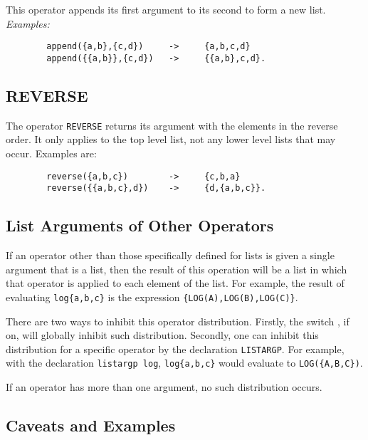 This operator appends its first argument to its second to
form a new list.
\textit{Examples:}
\begin{verbatim}
        append({a,b},{c,d})     ->     {a,b,c,d}
        append({{a,b}},{c,d})   ->     {{a,b},c,d}.
\end{verbatim}

\subsection{REVERSE}
\hypertarget{operator:REVERSE}{}

The operator \texttt{REVERSE} returns its argument with the
elements in the reverse order.  It only applies to the top level list, not
any lower level lists that may occur.  Examples are:
\begin{verbatim}
        reverse({a,b,c})        ->     {c,b,a}
        reverse({{a,b,c},d})    ->     {d,{a,b,c}}.
\end{verbatim}

\subsection{List Arguments of Other Operators}
\hypertarget{switch:LISTARGS}{}
\hypertarget{command:LISTARGP}{}

If an operator other than those specifically defined for lists is given a
single argument that is a list, then the result of this operation will be
a list in which that operator is applied to each element of the list.  For
example, the result of evaluating \texttt{log\{a,b,c\}} is the expression
\texttt{\{LOG(A),LOG(B),LOG(C)\}}.

There are two ways to inhibit this operator distribution.  Firstly, the
switch , if on, will globally inhibit
such distribution.  Secondly, one can inhibit this distribution for a
specific operator by the declaration \texttt{LISTARGP}. For
example, with the declaration \texttt{listargp log}, \texttt{log\{a,b,c\}}
 would evaluate to \texttt{LOG(\{A,B,C\})}.

If an operator has more than one argument, no such distribution occurs.

\subsection{Caveats and Examples}


